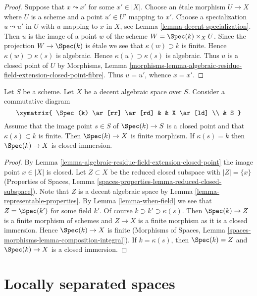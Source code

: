 \begin{proof}
Suppose that $x \leadsto x'$ for some $x' \in |X|$. Choose an
\'etale morphism $U \to X$ where $U$ is a scheme and a point $u' \in U'$
mapping to $x'$. Choose a specialization $u \leadsto u'$ in $U$ with $u$
mapping to $x$ in $X$, see Lemma \ref{lemma-decent-specialization}.
Then $u$ is the image of a point $w$ of the scheme
$W = \Spec(k) \times_X U$. Since the projection $W \to \Spec(k)$ is \'etale
we see that $\kappa(w) \supset k$ is finite. Hence
$\kappa(w) \supset \kappa(s)$ is algebraic. Hence $\kappa(u) \supset \kappa(s)$
is algebraic. Thus $u$ is a closed point of $U$ by
Morphisms, Lemma
\ref{morphisms-lemma-algebraic-residue-field-extension-closed-point-fibre}.
Thus $u = u'$, whence $x = x'$.
\end{proof}

\begin{lemma}
\label{lemma-finite-residue-field-extension-finite}
Let $S$ be a scheme. Let $X$ be a decent algebraic space over $S$.
Consider a commutative diagram
$$
\xymatrix{
\Spec(k) \ar[rr] \ar[rd] & & X \ar[ld] \\
& S
}
$$
Assume that the image point $s \in S$ of $\Spec(k) \to S$ is
a closed point and that $\kappa(s) \subset k$ is finite.
Then $\Spec(k) \to X$ is finite morphism. If $\kappa(s) = k$
then $\Spec(k) \to X$ is closed immersion.
\end{lemma}

\begin{proof}
By Lemma \ref{lemma-algebraic-residue-field-extension-closed-point}
the image point $x \in |X|$ is closed. Let $Z \subset X$ be the
reduced closed subspace with $|Z| = \{x\}$ (Properties of Spaces,
Lemma \ref{spaces-properties-lemma-reduced-closed-subspace}).
Note that $Z$ is a decent algebraic space by
Lemma \ref{lemma-representable-properties}.
By Lemma \ref{lemma-when-field} we see that $Z = \Spec(k')$
for some field $k'$. Of course $k \supset k' \supset \kappa(s)$.
Then $\Spec(k) \to Z$ is a finite morphism of schemes
and $Z \to X$ is a finite morphism as it is a closed immersion.
Hence $\Spec(k) \to X$ is finite (Morphisms of Spaces, Lemma
\ref{spaces-morphisms-lemma-composition-integral}).
If $k = \kappa(s)$, then $\Spec(k) = Z$ and $\Spec(k) \to X$
is a closed immersion.
\end{proof}





\section{Locally separated spaces}
\label{section-locally-separated}

